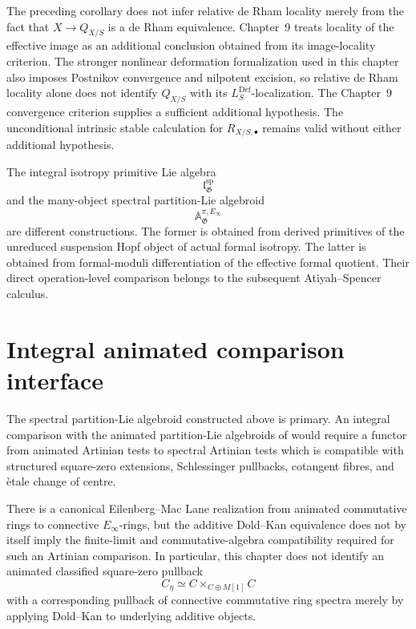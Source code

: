 \begin{remark}
The preceding corollary does not infer relative de Rham locality merely from
the fact that $X\to Q_{X/S}$ is a de Rham equivalence.  Chapter~9 treats
locality of the effective image as an additional conclusion obtained from its
image-locality criterion.  The stronger nonlinear deformation formalization
used in this chapter also imposes Postnikov convergence and nilpotent
excision, so relative de Rham locality alone does not identify
$Q_{X/S}$ with its $L^{\mathrm{Def}}_S$-localization.  The Chapter~9
convergence criterion supplies a sufficient additional hypothesis.  The
unconditional intrinsic stable calculation for $R_{X/S,\bullet}$ remains
valid without either additional hypothesis.
\end{remark}

\begin{remark}
The integral isotropy primitive Lie algebra
\[
    \mathfrak l^{\mathrm{sp}}_{\mathfrak G}
\]
and the many-object spectral partition-Lie algebroid
\[
    \mathbb A^{\pi,E_\infty}_{\mathfrak G}
\]
are different constructions.  The former is obtained from derived primitives
of the unreduced suspension Hopf object of actual formal isotropy.  The latter
is obtained from formal-moduli differentiation of the effective formal
quotient.  Their direct operation-level comparison belongs to the subsequent
Atiyah--Spencer calculus.
\end{remark}
\section{Integral animated comparison interface}
\label{sec:bnla-animated-shadow}

The spectral partition-Lie algebroid constructed above is primary.  An
integral comparison with the animated partition-Lie algebroids of
\cite{BrantnerMagidsonNuiten2025} would require a functor from animated
Artinian tests to spectral Artinian tests which is compatible with structured
square-zero extensions, Schlessinger pullbacks, cotangent fibres, and
\`etale change of centre.

There is a canonical Eilenberg--Mac Lane realization from animated
commutative rings to connective $E_\infty$-rings, but the additive
Dold--Kan equivalence does not by itself imply the finite-limit and
commutative-algebra compatibility required for such an Artinian comparison.
In particular, this chapter does not identify an animated classified
square-zero pullback
\[
    C_\eta
    \simeq
    C\times_{C\oplus M[1]}C
\]
with a corresponding pullback of connective commutative ring spectra merely
by applying Dold--Kan to underlying additive objects.

